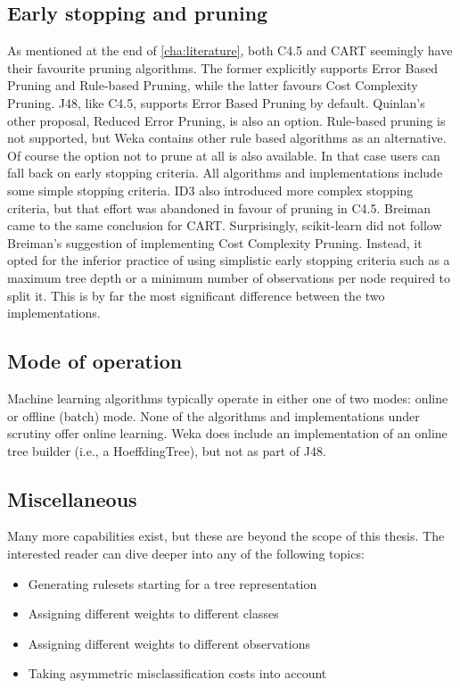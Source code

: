 \subsection{Early stopping and pruning}
As mentioned at the end of \autoref{cha:literature}, both C4.5 and CART seemingly have their favourite pruning algorithms. The former explicitly supports Error Based Pruning and Rule-based Pruning, while the latter favours Cost Complexity Pruning. J48, like C4.5, supports Error Based Pruning by default. Quinlan's other proposal, Reduced Error Pruning, is also an option. Rule-based pruning is not supported, but Weka contains other rule based algorithms as an alternative. Of course the option not to prune at all is also available. In that case users can fall back on early stopping criteria. All algorithms and implementations include some simple stopping criteria. ID3 also introduced more complex stopping criteria, but that effort was abandoned in favour of pruning in C4.5. Breiman came to the same conclusion for CART. Surprisingly, scikit-learn did not follow Breiman's suggestion of implementing Cost Complexity Pruning. Instead, it opted for the inferior practice of using simplistic early stopping criteria such as a maximum tree depth or a minimum number of observations per node required to split it. This is by far the most significant difference between the two implementations.

\subsection{Mode of operation}
Machine learning algorithms typically operate in either one of two modes: online or offline (batch) mode. None of the algorithms and implementations under scrutiny offer online learning. Weka does include an implementation of an online tree builder (i.e., a HoeffdingTree), but not as part of J48.

\subsection{Miscellaneous}
Many more capabilities exist, but these are beyond the scope of this thesis. The interested reader can dive deeper into any of the following topics:
\begin{itemize}
    \item Generating rulesets starting for a tree representation
    \item Assigning different weights to different classes
    \item Assigning different weights to different observations
    \item Taking asymmetric misclassification costs into account
\end{itemize}

